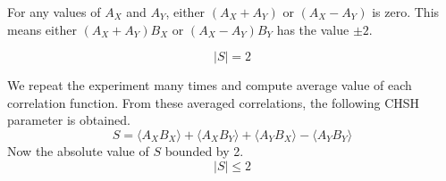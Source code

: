 \documentclass[14pt,a4paper]{extarticle}
\begin{document}
For any values of $A_X$ and $A_Y$, either $(A_X+A_Y)$ or $(A_X-A_Y)$ is zero. This means either $(A_X+A_Y)B_X$ or $(A_X-A_Y)B_Y$ has the value $\pm2$.

\begin{equation}
|S|=2
\end{equation}

We repeat the experiment many times and compute average value of each correlation function. From these averaged correlations, the following CHSH parameter is obtained.
\setcounter{equation}{0}
\begin{equation}
S=\langle A_XB_X \rangle+\langle A_XB_Y \rangle+\langle A_YB_X\rangle -\langle A_YB_Y \rangle
\end{equation}
Now the absolute value of $S$ bounded by 2.
\begin{equation}
|S|\leq2
\end{equation}
\end{document}
